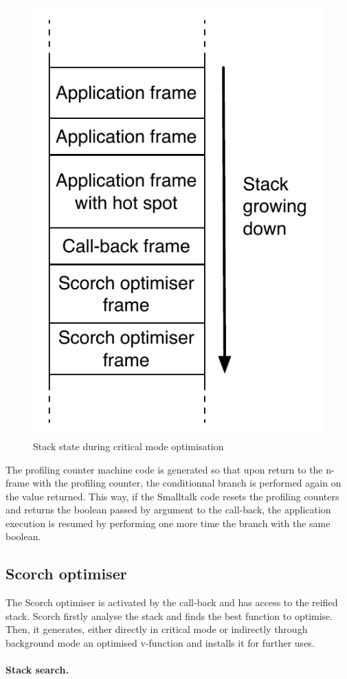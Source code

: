 \documentclass[a4paper,12pt,twoside]{../includes/ThesisStyle}
\begin{document}
\begin{figure}[h!]
    \begin{center}
        \includegraphics[width=0.35\linewidth]{HotSpotCallBackStack}
        \caption{Stack state during critical mode optimisation}
        \label{fig:HotSpotCallBackStack}
    \end{center}
\end{figure}


The profiling counter machine code is generated so that upon return to the n-frame with the profiling counter, the conditionnal branch is performed again on the value returned. This way, if the Smalltalk code resets the profiling counters and returns the boolean passed by argument to the call-back, the application execution is resumed by performing one more time the branch with the same boolean.


\subsection{Scorch optimiser}

The Scorch optimiser is activated by the call-back and has access to the reified stack. Scorch firstly analyse the stack and finds the best function to optimise. Then, it generates, either directly in critical mode or indirectly through background mode an optimised v-function and installs it for further uses.


\paragraph{Stack search.}
\label{ss:stackSearch}
\end{document}
